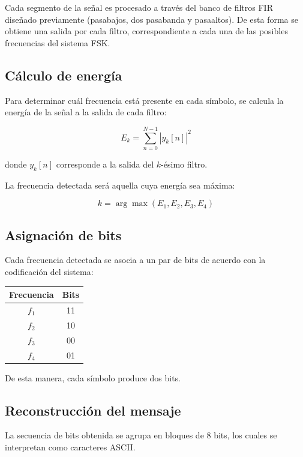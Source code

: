 \documentclass[9pt,a4paper,oneside]{rho-class/rho}
\begin{document}
Cada segmento de la señal es procesado a través del banco de filtros FIR
diseñado previamente (pasabajos, dos pasabanda y pasaaltos). De esta
forma se obtiene una salida por cada filtro, correspondiente a cada una
de las posibles frecuencias del sistema FSK.

\subsection{Cálculo de energía}

Para determinar cuál frecuencia está presente en cada símbolo, se calcula
la energía de la señal a la salida de cada filtro:

\begin{equation}
E_k = \sum_{n=0}^{N-1} |y_k[n]|^2
\end{equation}

donde $y_k[n]$ corresponde a la salida del $k$-ésimo filtro.

La frecuencia detectada será aquella cuya energía sea máxima:

\begin{equation}
k = \arg\max(E_1, E_2, E_3, E_4)
\end{equation}

\subsection{Asignación de bits}

Cada frecuencia detectada se asocia a un par de bits de acuerdo con la
codificación del sistema:

\begin{center}
\begin{tabular}{|c|c|}
\hline
Frecuencia & Bits \\
\hline
$f_1$ & 11 \\
$f_2$ & 10 \\
$f_3$ & 00 \\
$f_4$ & 01 \\
\hline
\end{tabular}
\end{center}

De esta manera, cada símbolo produce dos bits.

\subsection{Reconstrucción del mensaje}

La secuencia de bits obtenida se agrupa en bloques de 8 bits, los cuales
se interpretan como caracteres ASCII.
\end{document}
